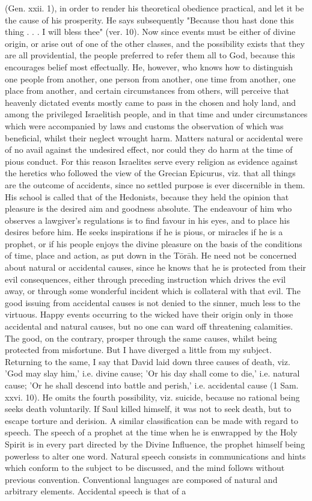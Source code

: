 \documentclass[12pt]{article}
\begin{document}
(Gen. xxii. 1), in order to render his theoretical obedience practical, and let it be the cause of his prosperity. He says subsequently "Because thou hast done this thing . . . I will bless thee" (ver. 10). Now since events must be either of divine origin, or arise out of one of the other classes, and the possibility exists that they are all providential, the people preferred to refer them all to God, because this encourages belief most effectually. He, however, who knows how to distinguish one people from another, one person from another, one time from another, one place from another, and certain circumstances from others, will perceive that heavenly dictated events mostly came to pass in the chosen and holy land, and among the privileged Israelitish people, and in that time and under circumstances which were accompanied by laws and customs the observation of which was beneficial, whilst their neglect wrought harm. Matters natural or accidental were of no avail against the undesired effect, nor could they do harm at the time of pious conduct. For this reason Israelites serve every religion as evidence against the heretics who followed the view of the Grecian Epicurus, viz. that all things are the outcome of accidents, since no settled purpose is ever discernible in them. His school is called that of the Hedonists, because they held the opinion that pleasure is the desired aim and goodness absolute. The endeavour of him who observes a lawgiver's regulations is to find favour in his eyes, and to place his desires before him. He seeks inspirations if he is pious, or miracles if he is a prophet, or if his people enjoys the divine pleasure on the basis of the conditions of time, place and action, as put down in the Tōrāh. He need not be concerned about natural or accidental causes, since he knows that he is protected from their evil consequences, either through preceding instruction which drives the evil away, or through some wonderful incident which is collateral with that evil. The good issuing from accidental causes is not denied to the sinner, much less to the virtuous. Happy events occurring to the wicked have their origin only in those accidental and natural causes, but no one can ward off threatening calamities. The good, on the contrary, prosper through the same causes, whilst being protected from misfortune. But I have diverged a little from my subject. Returning to the same, I say that David laid down three causes of death, viz. 'God may slay him,' i.e. divine cause; 'Or his day shall come to die,' i.e. natural cause; 'Or he shall descend into battle and perish,' i.e. accidental cause (1 Sam. xxvi. 10). He omits the fourth possibility, viz. suicide, because no rational being seeks death voluntarily. If Saul killed himself, it was not to seek death, but to escape torture and derision. A similar classification can be made with regard to speech. The speech of a prophet at the time when he is enwrapped by the Holy Spirit is in every part directed by the Divine Influence, the prophet himself being powerless to alter one word. Natural speech consists in communications and hints which conform to the subject to be discussed, and the mind follows without previous convention. Conventional languages are composed of natural and arbitrary elements. Accidental speech is that of a 
\end{document}
